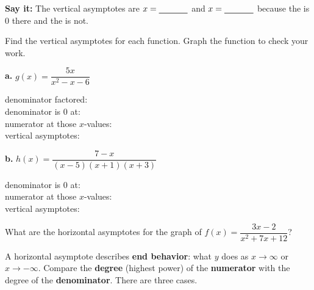 \textbf{Say it:} The vertical asymptotes are $x=\blank[1.2cm]$ and $x=\blank[1.2cm]$ because the \blank[2.5cm] is 0 there and the \blank[2.5cm] is not.

\newpage

Find the vertical asymptotes for each function. Graph the function to check your work.

\begin{minipage}[t]{0.48\textwidth}
\textbf{a.} $g(x)=\dfrac{5x}{x^2-x-6}$

\vspace{4pt}
denominator factored: \blank[3cm]\\[6pt]
denominator is 0 at: \blank[3cm]\\[6pt]
numerator at those $x$-values: \blank[2.2cm]\\[6pt]
vertical asymptotes: \blank[3.5cm]
\end{minipage}\hfill
\begin{minipage}[t]{0.48\textwidth}
\textbf{b.} $h(x)=\dfrac{7-x}{(x-5)(x+1)(x+3)}$

\vspace{4pt}
denominator is 0 at: \blank[3cm]\\[6pt]
numerator at those $x$-values: \blank[2.2cm]\\[6pt]
vertical asymptotes: \blank[3.5cm]
\end{minipage}

What are the horizontal asymptotes for the graph of $f(x)=\dfrac{3x-2}{x^2+7x+12}$?

A horizontal asymptote describes \textbf{end behavior}: what $y$ does as $x\to\infty$ or $x\to-\infty$. Compare the \textbf{degree} (highest power) of the \textbf{numerator} with the degree of the \textbf{denominator}. There are three cases.

